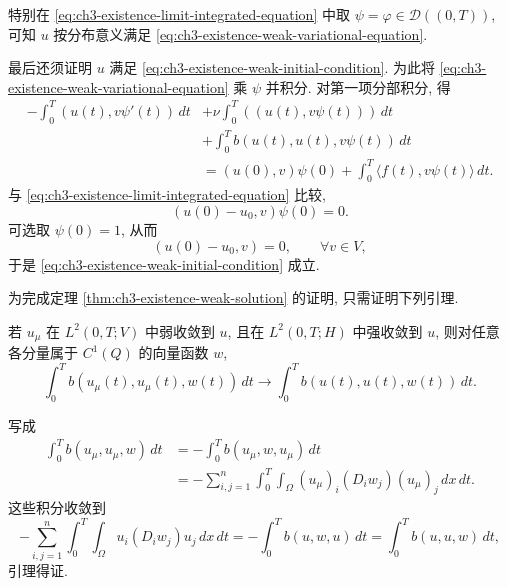 特别在 \eqref{eq:ch3-existence-limit-integrated-equation} 中取 $\psi=\varphi\in\mathcal D((0,T))$, 可知 $u$ 按分布意义满足 \eqref{eq:ch3-existence-weak-variational-equation}.

最后还须证明 $u$ 满足 \eqref{eq:ch3-existence-weak-initial-condition}. 为此将 \eqref{eq:ch3-existence-weak-variational-equation} 乘 $\psi$ 并积分. 对第一项分部积分, 得
\begin{equation}
\begin{aligned}
-\int_0^T(u(t),v\psi'(t))\,dt
&+\nu\int_0^T((u(t),v\psi(t)))\,dt\\
&+\int_0^T b(u(t),u(t),v\psi(t))\,dt\\
&=(u(0),v)\psi(0)+\int_0^T\langle f(t),v\psi(t)\rangle\,dt.
\end{aligned}
\label{eq:ch3-existence-solution-integrated-equation}
\end{equation}
与 \eqref{eq:ch3-existence-limit-integrated-equation} 比较,
\[
(u(0)-u_0,v)\psi(0)=0.
\]
可选取 $\psi(0)=1$, 从而
\[
(u(0)-u_0,v)=0,
\qquad\forall v\in V,
\]
于是 \eqref{eq:ch3-existence-weak-initial-condition} 成立.

\hypertarget{chapter-03-page-211}{}
为完成定理 \ref{thm:ch3-existence-weak-solution} 的证明, 只需证明下列引理.

\begin{Lemma}
\label{lem:ch3-existence-nonlinear-limit}
若 $u_\mu$ 在 $L^2(0,T;V)$ 中弱收敛到 $u$, 且在 $L^2(0,T;H)$ 中强收敛到 $u$, 则对任意各分量属于 $C^1(Q)$ 的向量函数 $w$,
\begin{equation}
\int_0^T b(u_\mu(t),u_\mu(t),w(t))\,dt
\longrightarrow\int_0^T b(u(t),u(t),w(t))\,dt.
\label{eq:ch3-existence-nonlinear-limit}
\end{equation}
\end{Lemma}

\begin{Proof}
写成
\[
\begin{aligned}
\int_0^T b(u_\mu,u_\mu,w)\,dt
&=-\int_0^T b(u_\mu,w,u_\mu)\,dt\\
&=-\sum_{i,j=1}^{n}\int_0^T\int_\Omega
(u_\mu)_i(D_iw_j)(u_\mu)_j\,dx\,dt.
\end{aligned}
\]
这些积分收敛到
\[
-\sum_{i,j=1}^{n}\int_0^T\int_\Omega u_i(D_iw_j)u_j\,dx\,dt
=-\int_0^T b(u,w,u)\,dt
=\int_0^T b(u,u,w)\,dt,
\]
引理得证.
\end{Proof}

